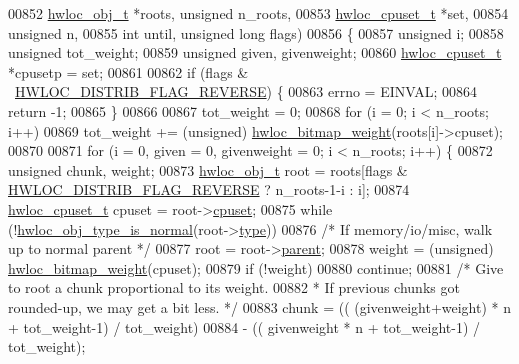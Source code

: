 \begin{DoxyCode}
00852               \hyperlink{a00238}{hwloc\_obj\_t} *roots, \textcolor{keywordtype}{unsigned} n\_roots,
00853               \hyperlink{a00183_ga4bbf39b68b6f568fb92739e7c0ea7801}{hwloc\_cpuset\_t} *\textcolor{keyword}{set},
00854               \textcolor{keywordtype}{unsigned} n,
00855               \textcolor{keywordtype}{int} until, \textcolor{keywordtype}{unsigned} \textcolor{keywordtype}{long} flags)
00856 \{
00857   \textcolor{keywordtype}{unsigned} i;
00858   \textcolor{keywordtype}{unsigned} tot\_weight;
00859   \textcolor{keywordtype}{unsigned} given, givenweight;
00860   \hyperlink{a00183_ga4bbf39b68b6f568fb92739e7c0ea7801}{hwloc\_cpuset\_t} *cpusetp = \textcolor{keyword}{set};
00861 
00862   \textcolor{keywordflow}{if} (flags & ~\hyperlink{a00201_gga8b835295a52b6768a5e6c8abb1f9c54da2ca08404bfbebe9ed5f34c3d7635425a}{HWLOC\_DISTRIB\_FLAG\_REVERSE}) \{
00863     errno = EINVAL;
00864     \textcolor{keywordflow}{return} -1;
00865   \}
00866 
00867   tot\_weight = 0;
00868   \textcolor{keywordflow}{for} (i = 0; i < n\_roots; i++)
00869     tot\_weight += (\textcolor{keywordtype}{unsigned}) \hyperlink{a00205_ga0200466842c0e1f5da75e84dde460b10}{hwloc\_bitmap\_weight}(roots[i]->cpuset);
00870 
00871   \textcolor{keywordflow}{for} (i = 0, given = 0, givenweight = 0; i < n\_roots; i++) \{
00872     \textcolor{keywordtype}{unsigned} chunk, weight;
00873     \hyperlink{a00238}{hwloc\_obj\_t} root = roots[flags & \hyperlink{a00201_gga8b835295a52b6768a5e6c8abb1f9c54da2ca08404bfbebe9ed5f34c3d7635425a}{HWLOC\_DISTRIB\_FLAG\_REVERSE} ? 
      n\_roots-1-i : i];
00874     \hyperlink{a00183_ga4bbf39b68b6f568fb92739e7c0ea7801}{hwloc\_cpuset\_t} cpuset = root->\hyperlink{a00238_a67925e0f2c47f50408fbdb9bddd0790f}{cpuset};
00875     \textcolor{keywordflow}{while} (!\hyperlink{a00198_ga52ef38431eba383b048b98c669b59a16}{hwloc\_obj\_type\_is\_normal}(root->\hyperlink{a00238_acc4f0803f244867e68fe0036800be5de}{type}))
00876       \textcolor{comment}{/* If memory/io/misc, walk up to normal parent */}
00877       root = root->\hyperlink{a00238_adc494f6aed939992be1c55cca5822900}{parent};
00878     weight = (unsigned) \hyperlink{a00205_ga0200466842c0e1f5da75e84dde460b10}{hwloc\_bitmap\_weight}(cpuset);
00879     \textcolor{keywordflow}{if} (!weight)
00880       \textcolor{keywordflow}{continue};
00881     \textcolor{comment}{/* Give to root a chunk proportional to its weight.}
00882 \textcolor{comment}{     * If previous chunks got rounded-up, we may get a bit less. */}
00883     chunk = (( (givenweight+weight) * n  + tot\_weight-1) / tot\_weight)
00884           - ((  givenweight         * n  + tot\_weight-1) / tot\_weight);

\end{DoxyCode}
